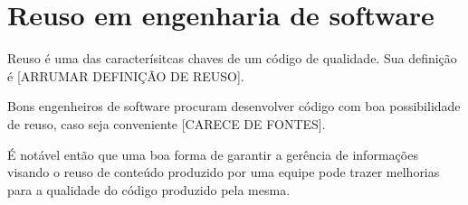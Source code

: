 \section{Reuso em engenharia de software}

Reuso é uma das caracterísitcas chaves de um código de qualidade. Sua definição é [ARRUMAR DEFINIÇÃO DE REUSO].

Bons engenheiros de software procuram desenvolver código com boa possibilidade de reuso, caso seja conveniente [CARECE DE FONTES].

É notável então que uma boa forma de garantir a gerência de informações visando o reuso de conteúdo produzido por uma equipe pode trazer melhorias para a qualidade do código produzido pela mesma.
